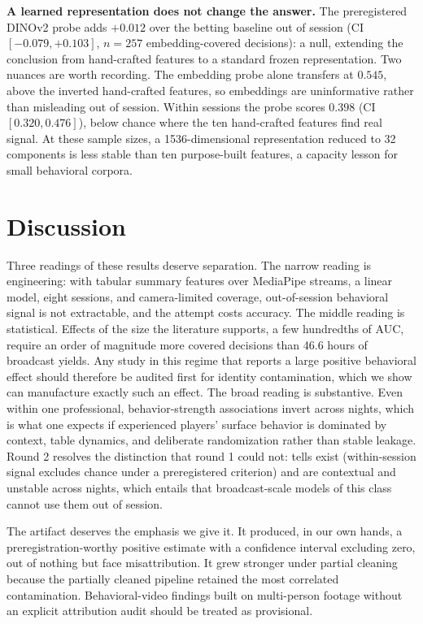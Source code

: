 \documentclass[conference]{IEEEtran}
\begin{document}
\textbf{A learned representation does not change the answer.} The
preregistered DINOv2 probe adds $+0.012$ over the betting baseline out
of session (CI $[-0.079, +0.103]$, $n=257$ embedding-covered
decisions): a null, extending the conclusion from hand-crafted features
to a standard frozen representation. Two nuances are worth recording.
The embedding probe alone transfers at $0.545$, above the inverted
hand-crafted features, so embeddings are uninformative rather than
misleading out of session. Within sessions the probe scores $0.398$
(CI $[0.320, 0.476]$), below chance where the ten hand-crafted features
find real signal. At these sample sizes, a 1536-dimensional
representation reduced to 32 components is less stable than ten
purpose-built features, a capacity lesson for small behavioral corpora.

\section{Discussion}

Three readings of these results deserve separation. The narrow reading is
engineering: with tabular summary features over MediaPipe streams, a
linear model, eight sessions, and camera-limited coverage,
out-of-session behavioral signal is not extractable, and the attempt
costs accuracy. The middle reading is statistical. Effects of the size
the literature supports, a few hundredths of AUC, require an order of
magnitude more covered decisions than 46.6 hours of broadcast yields.
Any study in this regime that reports a large positive behavioral effect
should therefore be audited first for identity contamination, which we
show can manufacture exactly such an effect. The broad reading is
substantive. Even within one professional, behavior-strength
associations invert across nights, which is what one expects if
experienced players' surface behavior is dominated by context, table
dynamics, and deliberate randomization rather than stable leakage.
Round 2 resolves the distinction that round 1 could not: tells exist
(within-session signal excludes chance under a preregistered criterion)
and are contextual and unstable across nights, which entails that
broadcast-scale models of this class cannot use them out of session.

The artifact deserves the emphasis we give it. It produced, in our own
hands, a preregistration-worthy positive estimate with a confidence
interval excluding zero, out of nothing but face misattribution. It grew
stronger under partial cleaning because the partially cleaned pipeline
retained the most correlated contamination. Behavioral-video findings
built on multi-person footage without an explicit attribution audit
should be treated as provisional.
\end{document}
